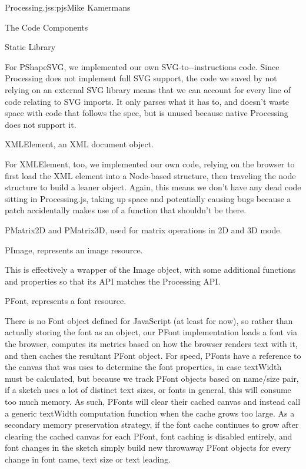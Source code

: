 \begin{aosachapter}{Processing.js}{s:pjs}{Mike Kamermans}
\begin{aosasect1}{The Code Components}
\begin{aosasect2}{Static Library}
\begin{aosaitemize}
For PShapeSVG, we implemented our own
SVG-to--instructions code. Since
Processing does not implement full SVG support, the code we saved by
not relying on an external SVG library means that we can account for
every line of code relating to SVG imports. It only parses what it has
to, and doesn't waste space with code that follows the spec, but is
unused because native Processing does not support it.

\item XMLElement, an XML document object.

For XMLElement, too, we implemented our own code, relying on the
browser to first load the XML element into a Node-based structure,
then traveling the node structure to build a leaner object. Again,
this means we don't have any dead code sitting in Processing.js,
taking up space and potentially causing bugs because a patch
accidentally makes use of a function that shouldn't be there.

\item PMatrix2D and PMatrix3D, used for matrix operations in 2D and 3D
  mode.

\item PImage, represents an image resource.

This is effectively a wrapper of the Image object, with some
additional functions and properties so that its API matches the
Processing API.

\item PFont, represents a font resource.

There is no Font object defined for JavaScript (at least for now), so
rather than actually storing the font as an object, our PFont
implementation loads a font via the browser, computes its metrics
based on how the browser renders text with it, and then caches the
resultant PFont object. For speed, PFonts have a reference to the
canvas that was uses to determine the font properties, in case
textWidth must be calculated, but because we track PFont objects based
on name/size pair, if a sketch uses a lot of distinct text sizes, or
fonts in general, this will consume too much memory. As such, PFonts
will clear their cached canvas and instead call a generic textWidth
computation function when the cache grows too large. As a secondary
memory preservation strategy, if the font cache continues to grow
after clearing the cached canvas for each PFont, font caching is
disabled entirely, and font changes in the sketch simply build new
throwaway PFont objects for every change in font name, text size or
text leading.


\end{aosaitemize}
\end{aosasect2}
\end{aosasect1}
\end{aosachapter}
